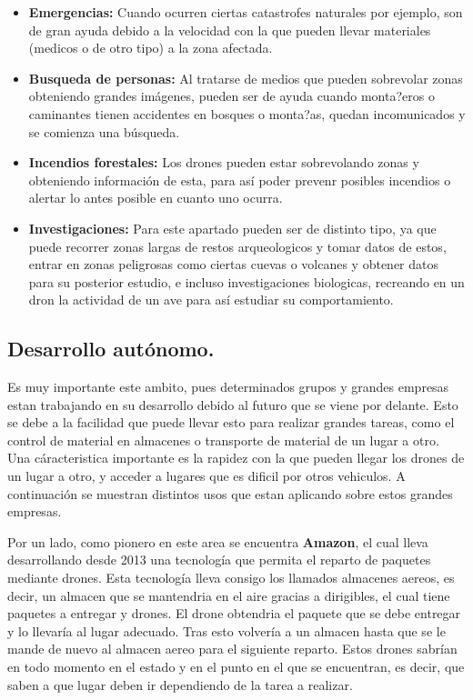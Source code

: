 \begin{itemize}
	\item \textbf{Emergencias:} Cuando ocurren ciertas catastrofes naturales por ejemplo, son de gran ayuda debido a la velocidad con la que pueden llevar materiales (medicos o de otro tipo) a la zona afectada.

	\item \textbf{Busqueda de personas:} Al tratarse de medios que pueden sobrevolar zonas obteniendo grandes im\'agenes, pueden ser de ayuda cuando monta?eros o caminantes tienen accidentes en bosques o monta?as, quedan incomunicados y se comienza una b\'usqueda.

	\item \textbf{Incendios forestales:} Los drones pueden estar sobrevolando zonas y obteniendo informaci\'on de esta, para as\'i poder prevenr posibles incendios o alertar lo antes posible en cuanto uno ocurra. 

\item \textbf{Investigaciones:} Para este apartado pueden ser de distinto tipo, ya que puede recorrer zonas largas de restos arqueologicos y tomar datos de estos, entrar en zonas peligrosas como ciertas cuevas o volcanes y obtener datos para su posterior estudio, e incluso investigaciones biologicas, recreando en un dron la actividad de un ave para as\'i estudiar su comportamiento.
\end{itemize}

\subsection{Desarrollo aut\'onomo.}
\hspace{1 cm} Es muy importante este ambito, pues determinados grupos y grandes empresas estan trabajando en su desarrollo debido al futuro que se viene por delante. Esto se debe a la facilidad que puede llevar esto para realizar grandes tareas, como el control de material en almacenes o transporte de material de un lugar a otro. Una c\'aracteristica importante es la rapidez con la que pueden llegar los drones de un lugar a otro, y acceder a lugares que es dificil por otros vehiculos. A continuaci\'on se muestran distintos usos que estan aplicando sobre estos grandes empresas. 


\hspace{1 cm} Por un lado, como pionero en este area se encuentra \textbf{Amazon}, el cual lleva desarrollando desde 2013 una tecnolog\'ia que permita el reparto de paquetes mediante drones. Esta tecnolog\'ia lleva consigo los llamados almacenes aereos, es decir, un almacen que se mantendria en el aire gracias a dirigibles, el cual tiene paquetes a entregar y drones. El drone obtendria el paquete que se debe entregar y lo llevar\'ia al lugar adecuado. Tras esto volver\'ia a un almacen hasta que se le mande de nuevo al almacen aereo para el siguiente reparto. Estos drones sabr\'ian en todo momento en el estado y en el punto en el que se encuentran, es decir, que saben a que lugar deben ir dependiendo de la tarea a realizar. 

